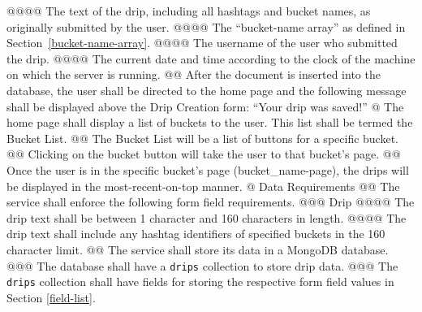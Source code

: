 \documentclass{article}
\begin{document}
\begin{easylist}[articletoc]
@@@@ The text of the drip, including all hashtags and bucket names, as originally submitted by the user.
@@@@ The ``bucket-name array'' as defined in Section~\ref{bucket-name-array}.
@@@@ The username of the user who submitted the drip.
@@@@ The current date and time according to the clock of the machine on which the server is running.
@@ After the document is inserted into the database, the user shall be directed to the home page and the following message shall be displayed above the Drip Creation form: ``Your drip was saved!''
@ The home page shall display a list of buckets to the user. This list shall be termed the Bucket List.
@@ The Bucket List will be a list of buttons for a specific bucket.
@@ Clicking on the bucket button will take the user to that bucket’s page.
@@ Once the user is in the specific bucket’s page (bucket\_name-page), the drips will be displayed in the most-recent-on-top manner.
@ Data Requirements
@@ The service shall enforce the following form field requirements.
@@@ Drip
@@@@ The drip text shall be between 1 character and 160 characters in length.
@@@@ The drip text shall include any hashtag identifiers of specified buckets in the 160 character limit.
@@ The service shall store its data in a MongoDB database.
@@@ The database shall have a \texttt{drips} collection to store drip data.
@@@ The \texttt{drips} collection shall have fields for storing the respective form field values in Section \ref{field-list}.

\end{easylist}
\end{document}
